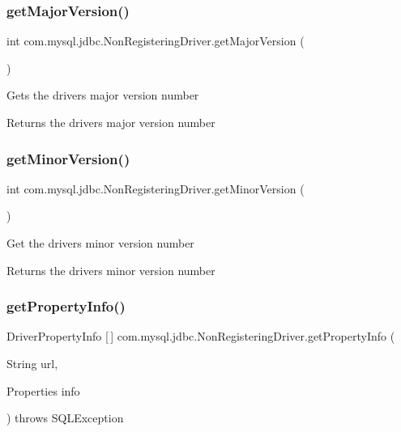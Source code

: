 \subsubsection{\texorpdfstring{get\+Major\+Version()}{getMajorVersion()}}
{\footnotesize\ttfamily int com.\+mysql.\+jdbc.\+Non\+Registering\+Driver.\+get\+Major\+Version (\begin{DoxyParamCaption}{ }\end{DoxyParamCaption})}

Gets the drivers major version number

\begin{DoxyReturn}{Returns}
the drivers major version number 
\end{DoxyReturn}
\mbox{\label{classcom_1_1mysql_1_1jdbc_1_1_non_registering_driver_a481b3ce93c080001bea84164b93489bf}} 
\subsubsection{\texorpdfstring{get\+Minor\+Version()}{getMinorVersion()}}
{\footnotesize\ttfamily int com.\+mysql.\+jdbc.\+Non\+Registering\+Driver.\+get\+Minor\+Version (\begin{DoxyParamCaption}{ }\end{DoxyParamCaption})}

Get the drivers minor version number

\begin{DoxyReturn}{Returns}
the drivers minor version number 
\end{DoxyReturn}
\mbox{\label{classcom_1_1mysql_1_1jdbc_1_1_non_registering_driver_a726bb5014e1cdfffa313257781d4496d}} 
\subsubsection{\texorpdfstring{get\+Property\+Info()}{getPropertyInfo()}}
{\footnotesize\ttfamily Driver\+Property\+Info \mbox{[}$\,$\mbox{]} com.\+mysql.\+jdbc.\+Non\+Registering\+Driver.\+get\+Property\+Info (\begin{DoxyParamCaption}\item[{String}]{url,  }\item[{Properties}]{info }\end{DoxyParamCaption}) throws S\+Q\+L\+Exception}

